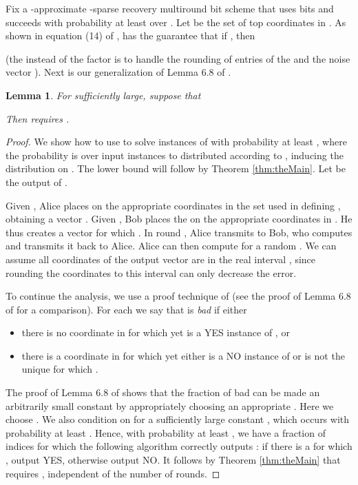\documentclass[twoside,leqno,twocolumn]{article}
\newtheorem{lemma}[theorem]{Lemma}
\begin{document}
Fix a -approximate -sparse recovery multiround bit scheme  that
uses  bits and succeeds with
probability at least  over .  
Let  be the set of top
 coordinates in . As shown in equation (14) of \cite{PW11},
 has the guarantee that if , then

(the  instead of the  factor is to handle the rounding of entries of
the  and the noise vector ). 
Next is our generalization of Lemma 6.8 of \cite{PW11}.


\begin{lemma}\label{lem:oneSide}
For  sufficiently large, suppose that 
 
Then  requires . 
\end{lemma}
\begin{proof}
We show how to use  to solve instances of 
  with probability at least , where the probability is
  over input instances to  distributed according to
  , inducing the distribution  on . The lower bound will
  follow by Theorem \ref{thm:theMain}. Let  be the output of 
  . 

  Given , Alice places  on the appropriate
  coordinates in the set  used in defining , obtaining a
  vector . 
  Given , Bob places the  on the appropriate
  coordinates in . He thus creates a vector  for which
  . In round , Alice transmits 
  to Bob, who computes  and transmits it back 
  to Alice. Alice can then compute  for a random
  . 
  We can assume all
  coordinates of the output vector  are in the real interval , since rounding the
  coordinates to this interval can only decrease the error.

  To continue the analysis, we use a proof technique of \cite{PW11} (see the proof
of Lemma 6.8 of \cite{PW11} for a comparison). 
For each  we say that  is {\it bad} if either
\begin{itemize}
\item there is no coordinate  in  for which 
yet  is a YES instance of , or
\item there is a coordinate  in  for which 
yet either  is a NO instance of  or  is
not the unique  for which . 
\end{itemize}
  The proof of Lemma 6.8 of \cite{PW11} shows that the fraction  of bad  can be made
  an arbitrarily small constant by appropriately choosing an appropriate .
  Here we choose . We also condition on  for a sufficiently
  large constant , which occurs
  with probability at least . Hence, with probability at least ,
  we have a  fraction of indices  for which the following algorithm
  correctly outputs : if there is a 
  for which , output YES, otherwise output NO. 
  It follows by Theorem \ref{thm:theMain} that 
  requires , independent of the number
  of rounds.
\end{proof}
\end{document}
